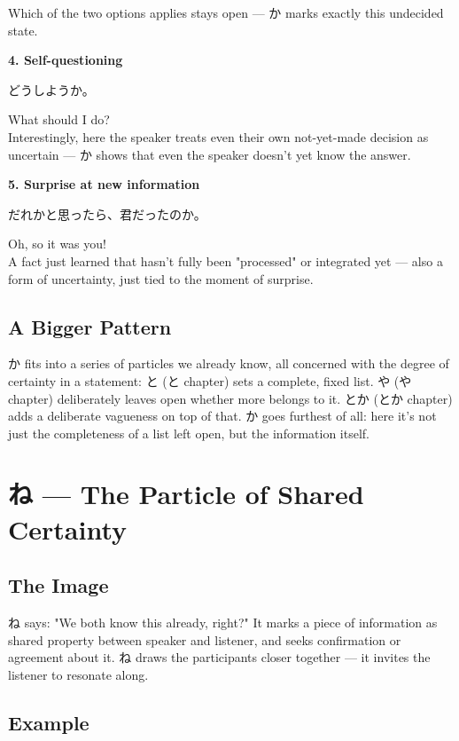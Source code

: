 \documentclass[12pt]{book}
\begin{document}
Which of the two options applies stays open — か marks exactly this undecided state.

\textbf{4. Self-questioning}
\par\quad どうしようか。\\
\par\quad What should I do?\\

Interestingly, here the speaker treats even their own not-yet-made decision as uncertain — か shows that even the speaker doesn't yet know the answer.

\textbf{5. Surprise at new information}
\par\quad だれかと思ったら、君だったのか。\\
\par\quad Oh, so it was you!\\

A fact just learned that hasn't fully been "processed" or integrated yet — also a form of uncertainty, just tied to the moment of surprise.

\section*{A Bigger Pattern}

か fits into a series of particles we already know, all concerned with the degree of certainty in a statement: と (と chapter) sets a complete, fixed list. や (や chapter) deliberately leaves open whether more belongs to it. とか (とか chapter) adds a deliberate vagueness on top of that. か goes furthest of all: here it's not just the completeness of a list left open, but the information itself.


\chapter{ね — The Particle of Shared Certainty}

\section*{The Image}

ね says: "We both know this already, right?" It marks a piece of information as shared property between speaker and listener, and seeks confirmation or agreement about it. ね draws the participants closer together — it invites the listener to resonate along.

\section*{Example}
\end{document}
